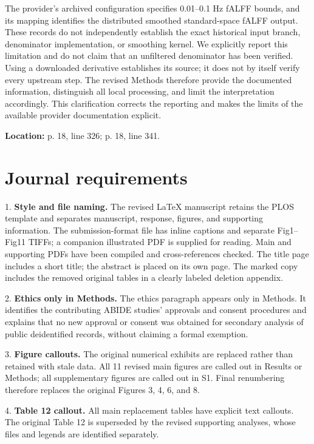 \documentclass[11pt]{article}
\begin{document}
The provider's archived configuration specifies 0.01--0.1 Hz fALFF bounds, and its mapping identifies the distributed smoothed standard-space fALFF output. These records do not independently establish the exact historical input branch, denominator implementation, or smoothing kernel. We explicitly report this limitation and do not claim that an unfiltered denominator has been verified. Using a downloaded derivative establishes its source; it does not by itself verify every upstream step. The revised Methods therefore provide the documented information, distinguish all local processing, and limit the interpretation accordingly. This clarification corrects the reporting and makes the limits of the available provider documentation explicit.


\textbf{Location:} p. 18, line 326; p. 18, line 341.


\section*{Journal requirements}

1. \textbf{Style and file naming.} The revised LaTeX manuscript retains the PLOS template and    separates manuscript, response, figures, and supporting information. The submission-format file has inline captions and separate Fig1--Fig11 TIFFs; a companion illustrated PDF is supplied for reading. Main and supporting PDFs have been compiled and cross-references checked. The title page includes a short title; the abstract is placed on its own page. The marked copy includes the removed original tables in a clearly labeled deletion appendix.


2. \textbf{Ethics only in Methods.} The ethics paragraph appears only in Methods.    It identifies the contributing ABIDE studies' approvals and consent procedures    and explains that no new approval or consent was obtained for secondary    analysis of public deidentified records, without claiming a formal exemption.


3. \textbf{Figure callouts.} The original numerical exhibits are replaced rather than    retained with stale data. All 11 revised main figures are called out in Results    or Methods; all supplementary figures are called out in S1. Final renumbering    therefore replaces the original Figures 3, 4, 6, and 8.


4. \textbf{Table 12 callout.} All main replacement tables have explicit text    callouts. The original Table 12 is superseded by the revised supporting    analyses, whose files and legends are identified separately.
\end{document}
